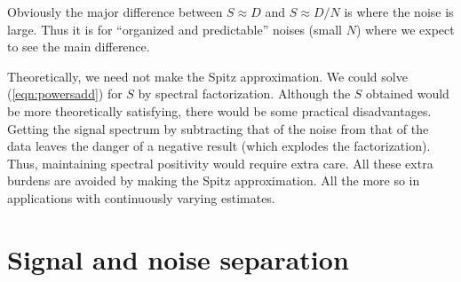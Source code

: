 \par
Obviously the major difference between
$ S \approx D$ and $S \approx D/N$ is where the noise is large.
Thus it is for ``organized and predictable'' noises (small $N$)
where we expect to see the main difference.

\par
Theoretically, we need not make the Spitz approximation.
We could solve (\ref{eqn:powersadd}) for $S$ by spectral factorization.
Although the $S$ obtained would be more theoretically satisfying,
there would be some practical disadvantages.
Getting the signal spectrum
by subtracting that of the noise from that of the data
leaves the danger of a negative result
(which explodes the factorization).
Thus,
maintaining spectral positivity would require extra care.
All these extra burdens are avoided by making the Spitz approximation.
All the more so in applications with continuously varying estimates.






\section{Signal and noise separation}

